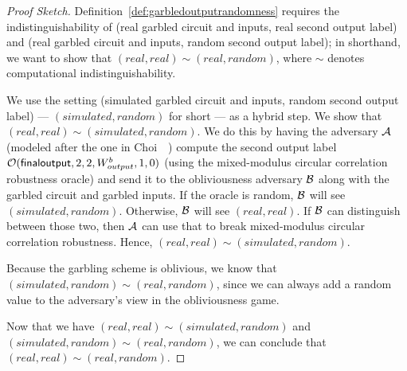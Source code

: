 \begin{proof}[Proof Sketch]

Definition~\ref{def:garbledoutputrandomness} requires the indistinguishability of (real garbled circuit and inputs, real second output label) and (real garbled circuit and inputs, random second output label); in shorthand, we want to show that $(real, real) \sim (real, random)$, where $\sim$ denotes computational indistinguishability.

We use the setting (simulated garbled circuit and inputs, random second output label) --- $(simulated, random)$ for short --- as a hybrid step.
We show that $(real, real) \sim (simulated, random)$.
We do this by having the adversary $\mathcal{A}$ (modeled after the one in Choi~\etal~\cite{TCC:CKKZ12}) compute %
the second output label $\mathcal{O}(\mathsf{finaloutput}, 2, 2, \allowbreak W_{output}^b, 1, 0)$ (using the mixed-modulus circular correlation robustness oracle) and send it to the obliviousness adversary $\mathcal{B}$ along with the garbled circuit and garbled inputs. 
If the oracle is random, $\mathcal{B}$ will see $(simulated, random)$.
Otherwise, $\mathcal{B}$ will see $(real, real)$.
If $\mathcal{B}$ can distinguish between those two, then $\mathcal{A}$ can use that to break mixed-modulus circular correlation robustness.
Hence, $(real, real) \sim (simulated, random)$.

Because the garbling scheme is oblivious, we know that $(simulated, random) \sim (real, random)$, since we can always add a random value to the adversary's view in the obliviousness game.

Now that we have $(real, real) \sim (simulated, random)$ and $(simulated, \allowbreak random) \allowbreak \sim (real, random)$, we can conclude that $(real, real) \sim (real, random)$.
 
\end{proof}


